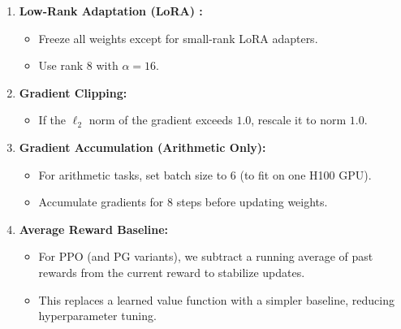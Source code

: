 \documentclass{article}
\theoremstyle{plain}
\theoremstyle{definition}
\theoremstyle{remark}
\begin{document}
\begin{enumerate}
    \item \textbf{Low-Rank Adaptation (LoRA) \citep{hu2022lora}:} 
    \begin{itemize}
        \item Freeze all weights except for small-rank LoRA adapters.
        \item Use rank 8 with $\alpha = 16$.
    \end{itemize}

    \item \textbf{Gradient Clipping:} 
    \begin{itemize}
        \item If the $\ell_2$ norm of the gradient exceeds $1.0$, rescale it to norm $1.0$.
    \end{itemize}

    \item \textbf{Gradient Accumulation (Arithmetic Only):} 
    \begin{itemize}
        \item For arithmetic tasks, set batch size to 6 (to fit on one H100 GPU).
        \item Accumulate gradients for 8 steps before updating weights.
    \end{itemize}

    \item \textbf{Average Reward Baseline:} 
    \begin{itemize}
        \item For PPO (and PG variants), we subtract a running average of past rewards from the current reward to stabilize updates.
        \item This replaces a learned value function with a simpler baseline, reducing hyperparameter tuning.
    \end{itemize}


\end{enumerate}
\end{document}
